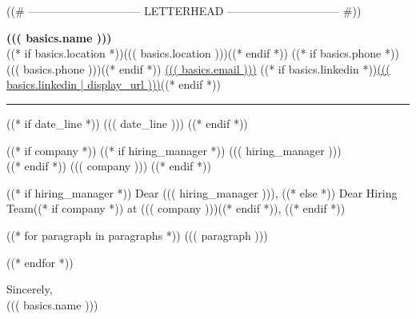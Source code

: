 \documentclass[11pt,letterpaper]{article}
\newcommand{\cvsep}{\hspace{5pt}\textperiodcentered\hspace{5pt}}
\begin{document}
((# ------------------------------ LETTERHEAD ------------------------------ #))
\begin{center}
  {\LARGE\bfseries ((( basics.name )))}\\[5pt]
  {\small
    ((* if basics.location *))((( basics.location )))\cvsep((* endif *))%
    ((* if basics.phone *))((( basics.phone )))\cvsep((* endif *))%
    \href{mailto:((( basics.email | url )))}{((( basics.email )))}%
    ((* if basics.linkedin *))\cvsep\href{((( basics.linkedin | url )))}{((( basics.linkedin | display_url )))}((* endif *))%
  }
\end{center}
\vspace{0.6em}
{\color{accent}\rule{\linewidth}{0.6pt}}
\vspace{0.4em}

((* if date_line *))
((( date_line )))
((* endif *))

((* if company *))
((* if hiring_manager *))
((( hiring_manager )))\\
((* endif *))
((( company )))
((* endif *))

((* if hiring_manager *))
Dear ((( hiring_manager ))),
((* else *))
Dear Hiring Team((* if company *)) at ((( company )))((* endif *)),
((* endif *))

((* for paragraph in paragraphs *))
((( paragraph )))

((* endfor *))

\vspace{0.6em}
Sincerely,\\[0.9em]
((( basics.name )))
\end{document}
